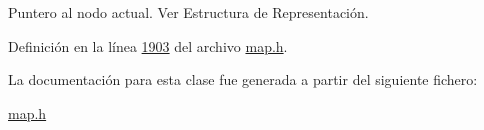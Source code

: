 \-Puntero al nodo actual. \-Ver \-Estructura de \-Representación. 



\-Definición en la línea \hyperlink{map_8h_source_l01903}{1903} del archivo \hyperlink{map_8h_source}{map.\-h}.



\-La documentación para esta clase fue generada a partir del siguiente fichero\-:\begin{DoxyCompactItemize}
\item 
\hyperlink{map_8h}{map.\-h}\end{DoxyCompactItemize}
